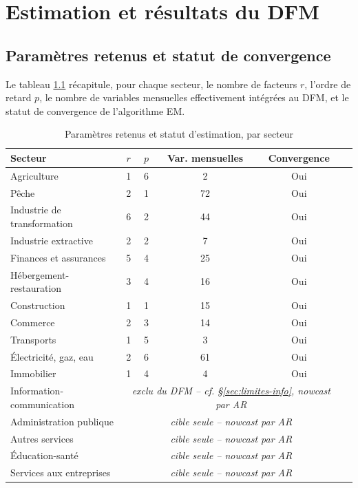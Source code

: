 \documentclass[11pt,a4paper]{report}
\begin{document}
\chapter{Estimation et résultats du DFM}

\section{Paramètres retenus et statut de convergence}

Le tableau \ref{tab:rp} récapitule, pour chaque secteur, le nombre de facteurs $r$, l'ordre de retard $p$, le nombre de variables mensuelles effectivement intégrées au DFM, et le statut de convergence de l'algorithme EM.

\begin{table}[H]
\centering
\caption{Paramètres retenus et statut d'estimation, par secteur}
\label{tab:rp}
\begin{tabular}{lccccc}
\toprule
Secteur & $r$ & $p$ & Var. mensuelles & Convergence \\
\midrule
Agriculture               & 1  & 6 & 2  & Oui \\
Pêche                     & 2  & 1 & 72 & Oui \\
Industrie de transformation & 6 & 2 & 44 & Oui \\
Industrie extractive       & 2  & 2 & 7  & Oui \\
Finances et assurances     & 5  & 4 & 25 & Oui \\
Hébergement-restauration   & 3  & 4 & 16 & Oui \\
Construction                & 1  & 1 & 15 & Oui \\
Commerce                    & 2  & 3 & 14 & Oui \\
Transports                  & 1  & 5 & 3  & Oui \\
Électricité, gaz, eau       & 2  & 6 & 61 & Oui \\
Immobilier                  & 1  & 4 & 4  & Oui \\
\midrule
Information-communication  & \multicolumn{4}{c}{\emph{exclu du DFM -- cf. \S\ref{sec:limites-info}, nowcast par AR}} \\
Administration publique    & \multicolumn{4}{c}{\emph{cible seule -- nowcast par AR}} \\
Autres services             & \multicolumn{4}{c}{\emph{cible seule -- nowcast par AR}} \\
Éducation-santé             & \multicolumn{4}{c}{\emph{cible seule -- nowcast par AR}} \\
Services aux entreprises    & \multicolumn{4}{c}{\emph{cible seule -- nowcast par AR}} \\
\bottomrule
\end{tabular}
\end{table}
\end{document}

